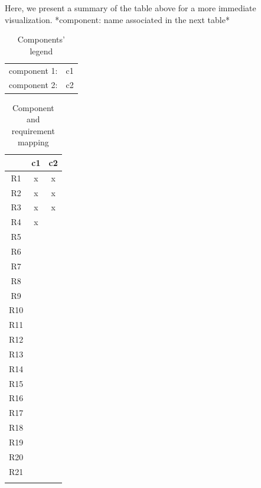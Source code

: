 \documentclass[table, 12pt]{article}
\begin{document}
Here, we present a summary of the table above for a more immediate visualization.
*component: name associated in the next table*
\begin{table}[H]
    \centering
    \begin{tabular}{|l l|}
        \hline
        component 1:& c1\\
        component 2:& c2\\\hline
        
    \end{tabular}
    \caption{Components' legend}
\end{table}
\newpage
\setlength\LTleft{-2.5cm}
\begin{longtable}{|c|c|c|}

    \hline
    & \cellcolor{blue!30}c1 & \cellcolor{blue!30}c2 \\\hline
    \cellcolor{SpringGreen!50}R1 & x & x \\\hline
    \cellcolor{SpringGreen!50}R2 & x & x \\\hline
    \cellcolor{SpringGreen!50}R3 & x & x \\\hline
    \cellcolor{SpringGreen!50}R4 & x &  \\\hline
    \cellcolor{SpringGreen!50}R5 &    & \\\hline
    \cellcolor{SpringGreen!50}R6 &    & \\\hline
    \cellcolor{SpringGreen!50}R7 &    & \\\hline
    \cellcolor{SpringGreen!50}R8 &    & \\\hline
    \cellcolor{SpringGreen!50}R9 &    & \\\hline
    \cellcolor{SpringGreen!50}R10 &    & \\\hline
    \cellcolor{SpringGreen!50}R11 &    & \\\hline
    \cellcolor{SpringGreen!50}R12 &    & \\\hline
    \cellcolor{SpringGreen!50}R13 &    & \\\hline
    \cellcolor{SpringGreen!50}R14 &    & \\\hline
    \cellcolor{SpringGreen!50}R15 &    & \\\hline
    \cellcolor{SpringGreen!50}R16 &    & \\\hline
    \cellcolor{SpringGreen!50}R17 &    & \\\hline
    \cellcolor{SpringGreen!50}R18 &    & \\\hline
    \cellcolor{SpringGreen!50}R19 &    & \\\hline
    \cellcolor{SpringGreen!50}R20 &    & \\\hline
    \cellcolor{SpringGreen!50}R21 & &\\\hline
    \caption{Component and requirement mapping}\\
\end{longtable}
\end{document}
